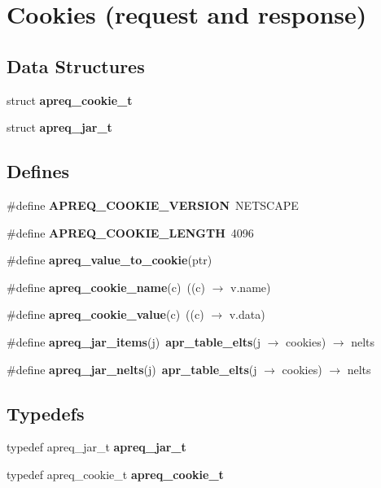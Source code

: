\section{Cookies (request and response)}
\label{group__cookies}
\subsection*{Data Structures}
\begin{CompactItemize}
\item 
struct {\bf apreq\_\-cookie\_\-t}
\item 
struct {\bf apreq\_\-jar\_\-t}
\end{CompactItemize}
\subsection*{Defines}
\begin{CompactItemize}
\item 
\#define {\bf APREQ\_\-COOKIE\_\-VERSION}\ NETSCAPE\label{group__cookies_a13}

\item 
\#define {\bf APREQ\_\-COOKIE\_\-LENGTH}\ 4096\label{group__cookies_a14}

\item 
\#define {\bf apreq\_\-value\_\-to\_\-cookie}(ptr)
\item 
\#define {\bf apreq\_\-cookie\_\-name}(c)\ ((c) $\rightarrow$ v.name)\label{group__cookies_a16}

\item 
\#define {\bf apreq\_\-cookie\_\-value}(c)\ ((c) $\rightarrow$ v.data)\label{group__cookies_a17}

\item 
\#define {\bf apreq\_\-jar\_\-items}(j)\ {\bf apr\_\-table\_\-elts}(j $\rightarrow$ cookies) $\rightarrow$ nelts\label{group__cookies_a18}

\item 
\#define {\bf apreq\_\-jar\_\-nelts}(j)\ {\bf apr\_\-table\_\-elts}(j $\rightarrow$ cookies) $\rightarrow$ nelts\label{group__cookies_a19}

\end{CompactItemize}
\subsection*{Typedefs}
\begin{CompactItemize}
\item 
typedef apreq\_\-jar\_\-t {\bf apreq\_\-jar\_\-t}
\item 
typedef apreq\_\-cookie\_\-t {\bf apreq\_\-cookie\_\-t}
\end{CompactItemize}
